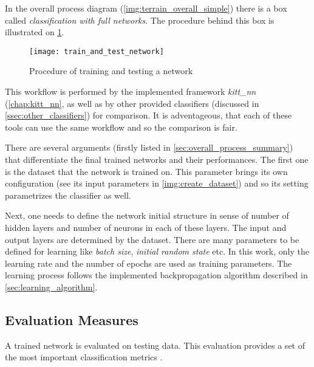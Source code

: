 In the overall process diagram (\cref{img:terrain_overall_simple}) there is a box called \textit{classification with full networks}. The procedure behind this box is illustrated on \cref{img:train_and_test_network}.

\begin{figure}[H]
  \centering
  \texttt{[image: train\_and\_test\_network]}
  \caption{Procedure of training and testing a network}
  \label{img:train_and_test_network}
\end{figure}

This workflow is performed by the implemented framework \textit{kitt\_nn} (\cref{chap:kitt_nn}, as well as by other provided classifiers (discussed in \cref{ssec:other_classifiers}) for comparison. It is adventageous, that each of these tools can use the same workflow and so the comparison is fair.

There are several arguments (firstly listed in \cref{sec:overall_process_summary}) that differentiate the final trained networks and their performances. The first one is the dataset that the network is trained on. This parameter brings its own configuration (see its input parameters in \cref{img:create_dataset}) and so its setting parametrizes the classifier as well.

Next, one needs to define the network initial structure in sense of number of hidden layers and number of neurons in each of these layers. The input and output layers are determined by the dataset. There are many parameters to be defined for learning like \textit{batch size}, \textit{initial random state} etc. In this work, only the learning rate and the number of epochs are used as training parameters. The learning process follows the implemented backpropagation algorithm described in \cref{sec:learning_algorithm}.

\subsection{Evaluation Measures} \label{ssec:evaluation_measures}
A trained network is evaluated on testing data. This evaluation provides a set of the most important classification metrics \citep{article:scikit-learn}.

